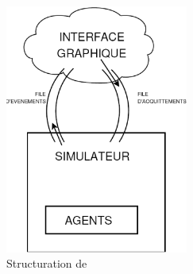 
\begin{figure}[h!t]
  \centering
  \includegraphics[width=6cm]{images/structureVisidia.eps}
  \caption{Structuration de \visidia}
  \label{fig:implantation-communication}
\end{figure}